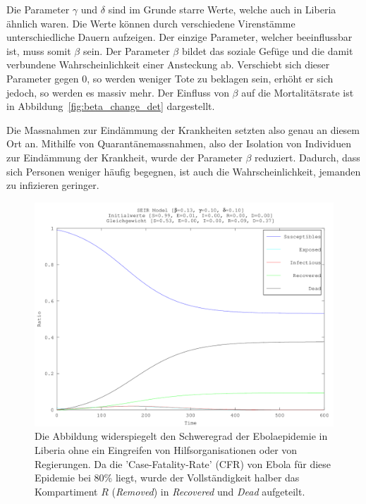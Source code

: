 \begin{refsection}
Die Parameter $\gamma$ und $\delta$ sind im Grunde starre Werte, welche auch in Liberia ähnlich waren. Die Werte können durch verschiedene Virenstämme unterschiedliche Dauern aufzeigen. Der einzige Parameter, welcher beeinflussbar ist, muss somit $\beta$ sein. Der Parameter $\beta$ bildet das soziale Gefüge und die damit verbundene Wahrscheinlichkeit einer Ansteckung ab. Verschiebt sich dieser Parameter gegen 0, so werden weniger Tote zu beklagen sein, erhöht er sich jedoch, so werden es massiv mehr. Der Einfluss von $\beta$ auf die Mortalitätsrate ist in Abbildung~\ref{fig:beta_change_det} dargestellt.

Die Massnahmen zur Eindämmung der Krankheiten setzten also genau an diesem Ort an. Mithilfe von Quarantänemassnahmen, also der Isolation von Individuen zur Eindämmung der Krankheit, wurde der Parameter $\beta$ reduziert. Dadurch, dass sich Personen weniger häufig begegnen, ist auch die Wahrscheinlichkeit, jemanden zu infizieren geringer.

\begin{figure}[p]
	\centering
	\includegraphics[width=.7\textwidth]{sir/images/ebola_outbreak}
  \caption[Ebola Ausbruch]{Die Abbildung widerspiegelt den Schweregrad der Ebolaepidemie in Liberia ohne ein Eingreifen von Hilfsorganisationen oder von Regierungen. Da die 'Case-Fatality-Rate' (CFR) von Ebola für diese Epidemie bei 80\% liegt\cite{sir:estimating_fatality}, wurde der Vollständigkeit halber das Kompartiment $R$ (\emph{Removed}) in \emph{Recovered} und \emph{Dead} aufgeteilt.}
  \label{fig:ebola_outbreak}
\end{figure}


\end{refsection}
